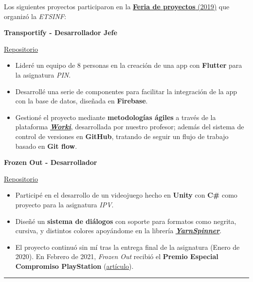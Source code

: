 \documentclass[letterpaper, 12pt, dvipsnames]{article}
\begin{document}
\vspace{.5em}

Los siguientes proyectos participaron en la \href{https://es-es.facebook.com/etsinf/videos/feria-de-proyectos-de-estudiantes-2019/1921312964681641/}{\textbf{Feria de proyectos} (2019)} que organizó la \emph{ETSINF}:

\vspace{.3em}

\begin{center}
    \large{\textbf{Transportify - Desarrollador Jefe}}\par
    \vspace{.2em}
    \href{https://github.com/Mobility-Solutions/Transportify}{Repositorio}
\end{center}
\begin{itemize}
    \item Lideré un equipo de 8 personas en la creación de una app con \textbf{Flutter} para la asignatura \emph{PIN}.
    \item Desarrollé una serie de componentes para facilitar la integración de la app con la base de datos, diseñada en \textbf{Firebase}.
    \item Gestioné el proyecto mediante \textbf{metodologías ágiles} a través de la plataforma \href{http://www.tuneupprocess.com/}{\textbf{\emph{Worki}}}, desarrollada por nuestro profesor; además del sistema de control de versiones en \textbf{GitHub}, tratando de seguir un flujo de trabajo basado en \textbf{Git flow}.
\end{itemize}
\vspace{1em}
\begin{center}
    \large{\textbf{Frozen Out - Desarrollador}}\par
    \vspace{.2em}
    \href{https://github.com/Mobility-Solutions/Transportify}{Repositorio}
\end{center}
\begin{itemize}
    \item Participé en el desarrollo de un videojuego hecho en \textbf{Unity} con \textbf{C\#} como proyecto para la asignatura \emph{IPV}.
    \item Diseñé un \textbf{sistema de diálogos} con soporte para formatos como negrita, cursiva, y distintos colores apoyándome en la librería \href{https://yarnspinner.dev/}{\textbf{\emph{YarnSpinner}}}.
    \item El proyecto continuó sin mí tras la entrega final de la asignatura (Enero de 2020). En Febrero de 2021, \emph{Frozen Out} recibió el \textbf{Premio Especial Compromiso PlayStation} (\href{https://www.inf.upv.es/www/etsinf/es/premio-especial-compromiso-playstation-para-el-videojuego-frozen-out-creado-por-estudiantes-de-la-etsinf-y-la-facultat-de-bb-aa/}{artículo}).
\end{itemize}
\rule{\textwidth}{.4pt}
\end{document}
